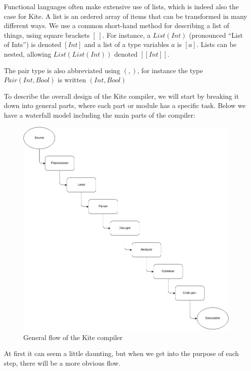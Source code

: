 
Functional languages often make extensive use of lists, which is indeed also the case for Kite. A list is an ordered array of items that can be transformed in many different ways. We use a common short-hand method for describing a list of things, using square brackets $[\ ]$. For instance, a $List(Int)$ (pronounced ``List of Ints'') is denoted $[Int]$ and a list of a type variables $a$ is $[a]$. Lists can be nested, allowing $List(List(Int))$ denoted $[[Int]]$.

The pair type is also abbreviated using $(,)$, for instance the type $Pair(Int, Bool)$ is written $(Int, Bool)$

To describe the overall design of the Kite compiler, we will start by
breaking it down into general parts, where each part or module has a
specific task. Below we have a waterfall model including the main
parts of the compiler:

\begin{figure}[H]
  \label{fig:flow}
  \center
  \includegraphics[scale=0.45]{images/flow.png}
  \caption{General flow of the Kite compiler}
\end{figure}

At first it can seem a little daunting, but when we get into the
purpose of each step, there will be a more obvious flow.


